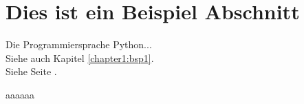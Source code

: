 \section{Dies ist ein Beispiel Abschnitt}



Die Programmiersprache Python... \cite{Pilgrim2009} \\

Siehe auch Kapitel \ref{chapter1:bsp1}. \\

Siehe Seite \pageref{chapter1:bsp1}.




aaaaaa